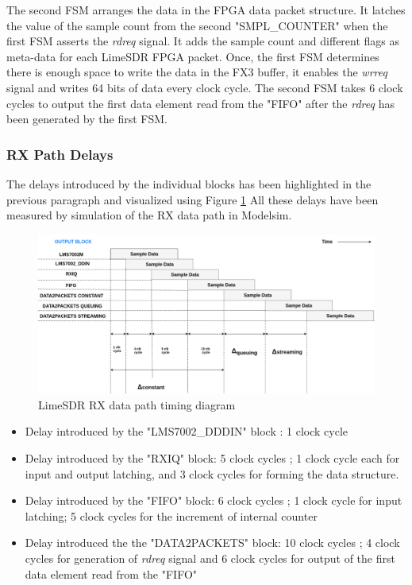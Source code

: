 The second \ac{FSM} arranges the data in the FPGA data packet structure.
It latches the value of the sample count from the second "SMPL\_COUNTER" when the first \ac{FSM} asserts the \textit{rdreq} signal.
It adds the sample count and different flags as meta-data for each LimeSDR \ac{FPGA} packet. 
Once, the first \ac{FSM} determines there is enough space to write the data in the FX3 buffer, it enables the \textit{wrreq} signal and writes 64 bits of data every clock cycle.
The second \ac{FSM} takes 6 clock cycles to output the first data element read from the "FIFO" after the \textit{rdreq} has been generated by the first \ac{FSM}.\\

\subsubsection{RX Path Delays}
The delays introduced by the individual blocks has been highlighted in the previous paragraph and visualized using Figure \ref{timing_diagram}
All these delays have been measured by simulation of the RX data path in Modelsim.

\begin{figure}[h!]
\centering
\includegraphics[width=\textwidth]{Thesis/Figure/Timing_Diagram.png}
\caption{LimeSDR RX data path timing diagram}
\label{timing_diagram}
\end{figure}

\begin{itemize}
\item{Delay introduced by the "LMS7002\_DDDIN" block : 1 clock cycle}
\item{Delay introduced by the "RXIQ" block: 5 clock cycles ; 1 clock cycle each for input and output latching, and 3 clock cycles for forming the data structure.}
\item{Delay introduced by the "FIFO" block: 6 clock cycles ; 1 clock cycle for input latching; 5 clock cycles for the increment of internal counter}
\item{Delay introduced the the "DATA2PACKETS" block: 10 clock cycles ; 4 clock cycles for generation of \textit{rdreq} signal and 6 clock cycles for output of the first data element read from the "FIFO"}
\end{itemize}

